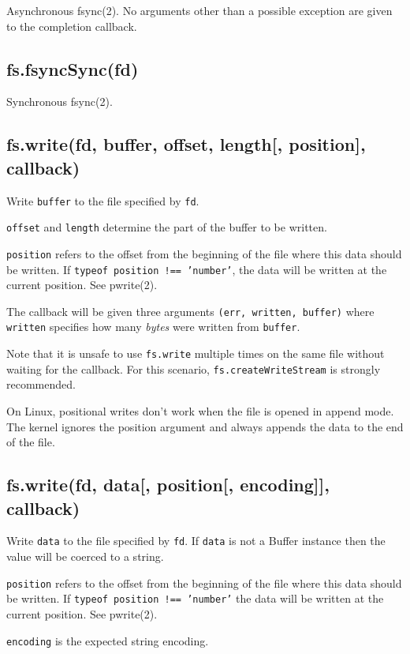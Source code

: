 Asynchronous fsync(2). No arguments other than a possible exception are
given to the completion callback.

\subsection{fs.fsyncSync(fd)}

Synchronous fsync(2).

\subsection{fs.write(fd, buffer, offset, length{[}, position{]},
callback)}

Write \texttt{buffer} to the file specified by \texttt{fd}.

\texttt{offset} and \texttt{length} determine the part of the buffer to
be written.

\texttt{position} refers to the offset from the beginning of the file
where this data should be written. If
\texttt{typeof position !== 'number'}, the data will be written at the
current position. See pwrite(2).

The callback will be given three arguments
\texttt{(err, written, buffer)} where \texttt{written} specifies how
many \emph{bytes} were written from \texttt{buffer}.

Note that it is unsafe to use \texttt{fs.write} multiple times on the
same file without waiting for the callback. For this scenario,
\texttt{fs.createWriteStream} is strongly recommended.

On Linux, positional writes don't work when the file is opened in append
mode. The kernel ignores the position argument and always appends the
data to the end of the file.

\subsection{fs.write(fd, data{[}, position{[}, encoding{]}{]},
callback)}

Write \texttt{data} to the file specified by \texttt{fd}. If
\texttt{data} is not a Buffer instance then the value will be coerced to
a string.

\texttt{position} refers to the offset from the beginning of the file
where this data should be written. If
\texttt{typeof position !== 'number'} the data will be written at the
current position. See pwrite(2).

\texttt{encoding} is the expected string encoding.

